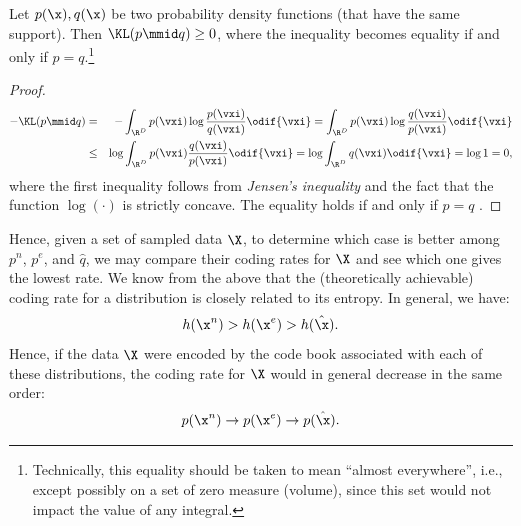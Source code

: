 \documentclass[../../book-main.tex]{subfiles}
\begin{document}
\begin{theorem}\label{thm:information-inequality}
	Let $p(\x), q(\x)$ be two probability density functions (that have the same
	support). Then $\KL(p\mmid q) \ge 0$, where the inequality becomes equality if and only if $p = q$.\footnote{Technically, this equality should be taken to mean ``almost everywhere'', i.e., except possibly on a set of zero measure (volume), since this set would not impact the value of any integral.}
\end{theorem}
\begin{proof}
	\begin{eqnarray*}
		- \KL(p\mmid q)
		&=& - \int_{\R^{D}} p(\vxi) \log \frac{p(\vxi)}{q(\vxi)} \odif{\vxi}
		=  \int_{\R^{D}} p(\vxi) \log \frac{q(\vxi)}{p(\vxi)} \odif{\vxi} \\
		&\le& \log \int_{\R^{D}} p(\vxi)  \frac{q(\vxi)}{p(\vxi)} \odif{\vxi} \label{eqn:jensen-KL}
		= \log \int_{\R^{D}} q(\vxi) \odif{\vxi} = \log 1 = 0,
	\end{eqnarray*}
	where the first inequality follows from {\em Jensen's inequality} and the
	fact that the function $\log(\cdot)$ is strictly concave. The equality holds
	if and only if $p = q$ .
\end{proof}

Hence, given a set of sampled data $\X$, to determine which case is better among $p^{n}$, $p^{e}$,  and $\hat{q}$, we may compare their coding rates for $\X$ and see which one gives the lowest rate. We know from the above that the (theoretically achievable) coding rate for a distribution is closely related to its entropy. In general, we have:
\begin{equation}
	h(\x^n) > h(\x^e) > h(\hat \x).
\end{equation}
Hence, if the data $\X$ were encoded by the code book associated with each of these distributions, the coding rate for $\X$ would in general decrease in the same order:
\begin{equation}
	p(\x^n) \rightarrow p(\x^e) \rightarrow p(\hat \x).
\end{equation}
\end{document}
